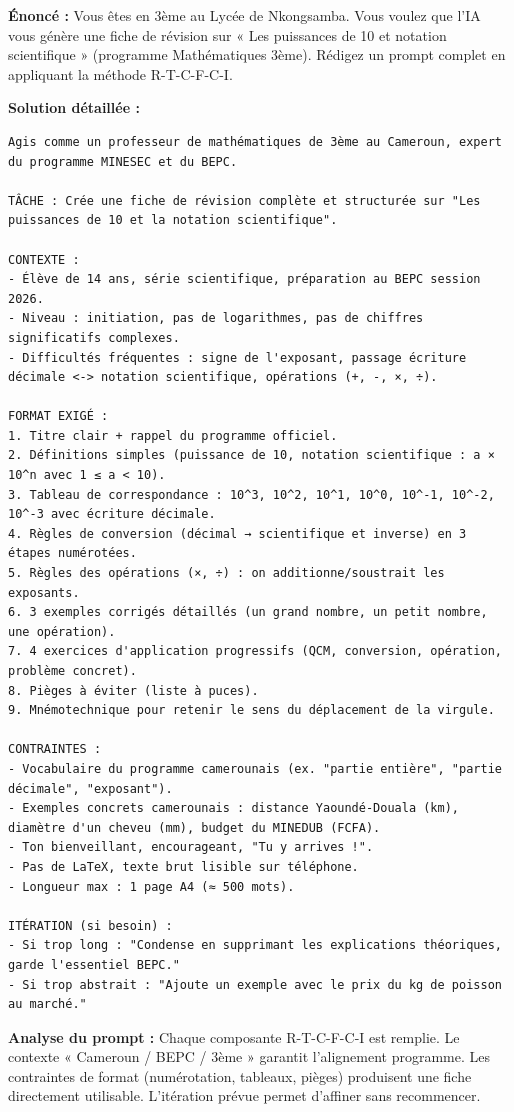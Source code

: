 \documentclass[11pt]{article}
\begin{document}
\begin{exoresolu}
\textbf{Énoncé :} Vous êtes en 3ème au Lycée de Nkongsamba. Vous voulez que l'IA vous génère une fiche de révision sur « Les puissances de 10 et notation scientifique » (programme Mathématiques 3ème). Rédigez un prompt complet en appliquant la méthode R-T-C-F-C-I.

\tcblower
\textbf{Solution détaillée :}

\begin{lstlisting}[language=text]
Agis comme un professeur de mathématiques de 3ème au Cameroun, expert du programme MINESEC et du BEPC.

TÂCHE : Crée une fiche de révision complète et structurée sur "Les puissances de 10 et la notation scientifique".

CONTEXTE : 
- Élève de 14 ans, série scientifique, préparation au BEPC session 2026.
- Niveau : initiation, pas de logarithmes, pas de chiffres significatifs complexes.
- Difficultés fréquentes : signe de l'exposant, passage écriture décimale <-> notation scientifique, opérations (+, -, ×, ÷).

FORMAT EXIGÉ :
1. Titre clair + rappel du programme officiel.
2. Définitions simples (puissance de 10, notation scientifique : a × 10^n avec 1 ≤ a < 10).
3. Tableau de correspondance : 10^3, 10^2, 10^1, 10^0, 10^-1, 10^-2, 10^-3 avec écriture décimale.
4. Règles de conversion (décimal → scientifique et inverse) en 3 étapes numérotées.
5. Règles des opérations (×, ÷) : on additionne/soustrait les exposants.
6. 3 exemples corrigés détaillés (un grand nombre, un petit nombre, une opération).
7. 4 exercices d'application progressifs (QCM, conversion, opération, problème concret).
8. Pièges à éviter (liste à puces).
9. Mnémotechnique pour retenir le sens du déplacement de la virgule.

CONTRAINTES :
- Vocabulaire du programme camerounais (ex. "partie entière", "partie décimale", "exposant").
- Exemples concrets camerounais : distance Yaoundé-Douala (km), diamètre d'un cheveu (mm), budget du MINEDUB (FCFA).
- Ton bienveillant, encourageant, "Tu y arrives !".
- Pas de LaTeX, texte brut lisible sur téléphone.
- Longueur max : 1 page A4 (≈ 500 mots).

ITÉRATION (si besoin) : 
- Si trop long : "Condense en supprimant les explications théoriques, garde l'essentiel BEPC."
- Si trop abstrait : "Ajoute un exemple avec le prix du kg de poisson au marché."
\end{lstlisting}

\textbf{Analyse du prompt :} Chaque composante R-T-C-F-C-I est remplie. Le contexte « Cameroun / BEPC / 3ème » garantit l'alignement programme. Les contraintes de format (numérotation, tableaux, pièges) produisent une fiche directement utilisable. L'itération prévue permet d'affiner sans recommencer.
\end{exoresolu}
\end{document}
